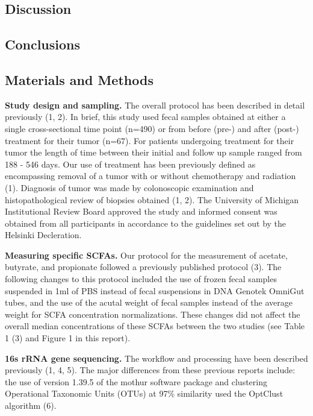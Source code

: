 \documentclass[11pt,]{article}
\begin{document}
\newpage

\subsection{Discussion}\label{discussion}

\newpage

\subsection{Conclusions}\label{conclusions}

\newpage

\subsection{Materials and Methods}\label{materials-and-methods}

\textbf{Study design and sampling.} The overall protocol has been
described in detail previously (1, 2). In brief, this study used fecal
samples obtained at either a single cross-sectional time point (n=490)
or from before (pre-) and after (post-) treatment for their tumor
(n=67). For patients undergoing treatment for their tumor the length of
time between their initial and follow up sample ranged from 188 - 546
days. Our use of treatment has been previously defined as encompassing
removal of a tumor with or without chemotherapy and radiation (1).
Diagnosis of tumor was made by colonoscopic examination and
histopathological review of biopsies obtained (1, 2). The University of
Michigan Institutional Review Board approved the study and informed
consent was obtained from all participants in accordance to the
guidelines set out by the Helsinki Decleration.

\textbf{Measuring specific SCFAs.} Our protocol for the measurement of
acetate, butyrate, and propionate followed a previously published
protocol (3). The following changes to this protocol included the use of
frozen fecal samples suspended in 1ml of PBS instead of fecal
suspensions in DNA Genotek OmniGut tubes, and the use of the acutal
weight of fecal samples instead of the average weight for SCFA
concentration normalizations. These changes did not affect the overall
median concentrations of these SCFAs between the two studies (see Table
1 (3) and Figure 1 in this report).

\textbf{16s rRNA gene sequencing.} The workflow and processing have been
described previously (1, 4, 5). The major differences from these
previous reports include: the use of version 1.39.5 of the mothur
software package and clustering Operational Taxonomic Units (OTUs) at
97\% similarity used the OptClust algorithm (6).
\end{document}
